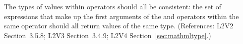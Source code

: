 The types of values within  operators should all
be consistent: the set of expressions that make up the first
arguments of the  and  operators
within the same  operator should all return
values of the same type.  (References: L2V2 Section~3.5.8; L2V3 
Section~3.4.9; L2V4 Section~\ref{sec:mathmltype}.)
